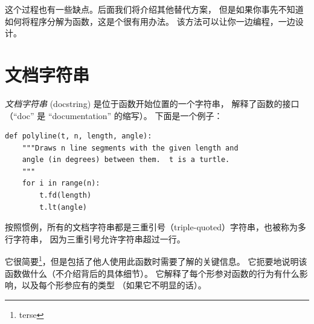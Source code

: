 
这个过程也有一些缺点。后面我们将介绍其他替代方案，
但是如果你事先不知道如何将程序分解为函数，这是个很有用办法。
该方法可以让你一边编程，一边设计。

\section{文档字符串}
\label{docstring}


\emph{文档字符串} (docstring) 是位于函数开始位置的一个字符串，
解释了函数的接口（``doc'' 是 ``documentation'' 的缩写）。 下面是一个例子：

\begin{lstlisting}
def polyline(t, n, length, angle):
    """Draws n line segments with the given length and
    angle (in degrees) between them.  t is a turtle.
    """
    for i in range(n):
        t.fd(length)
        t.lt(angle)
\end{lstlisting}


按照惯例，所有的文档字符串都是三重引号（triple-quoted）字符串，也被称为多行字符串，
因为三重引号允许字符串超过一行。
  
  


它很简要\footnote{terse}，但是包括了他人使用此函数时需要了解的关键信息。
它扼要地说明该函数做什么（不介绍背后的具体细节）。
它解释了每个形参对函数的行为有什么影响，以及每个形参应有的类型
（如果它不明显的话）。

